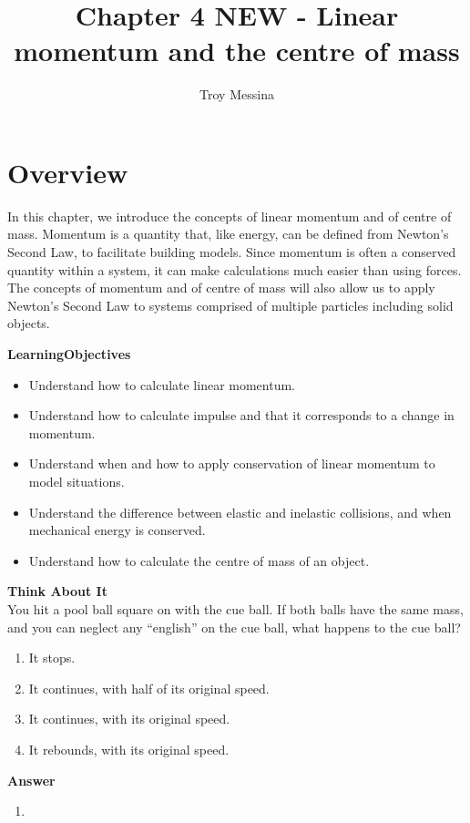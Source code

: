 \documentclass[9pt,arxiv,red]{lapreprint}
\title{Chapter 4 NEW - Linear momentum and the centre of mass}
\author[1]{Troy Messina}
\affil[1]{Berea College}
\begin{document}
\maketitle


\section{Overview}\label{chap:momentumandcm}

In this chapter, we introduce the concepts of linear momentum and of centre of mass. Momentum is a quantity that, like energy, can be defined from Newton's Second Law, to facilitate building models. Since momentum is often a conserved quantity within a system, it can make calculations much easier than using forces. The concepts of momentum and of centre of mass will also allow us to apply Newton's Second Law to systems comprised of multiple particles including solid objects.

\begin{framed}
\textbf{LearningObjectives}\\
\begin{itemize}
\item Understand how to calculate linear momentum.
\item Understand how to calculate impulse and that it corresponds to a change in momentum.
\item Understand when and how to apply conservation of linear momentum to model situations.
\item Understand the difference between elastic and inelastic collisions, and when mechanical energy is conserved.
\item Understand how to calculate the centre of mass of an object.
\end{itemize}
\end{framed}

\begin{framed}
\textbf{Think About It}\\
You hit a pool ball square on with the cue ball. If both balls have the same mass, and you can neglect any ``english'' on the cue ball, what happens to the cue ball?

\begin{enumerate}
\item It stops.
\item It continues, with half of its original speed.
\item It continues, with its original speed.
\item It rebounds, with its original speed.
\end{enumerate}

\begin{framed}
\textbf{Answer}\\
\begin{enumerate}
\item
\end{enumerate}
\end{framed}
\end{framed}
\end{document}
